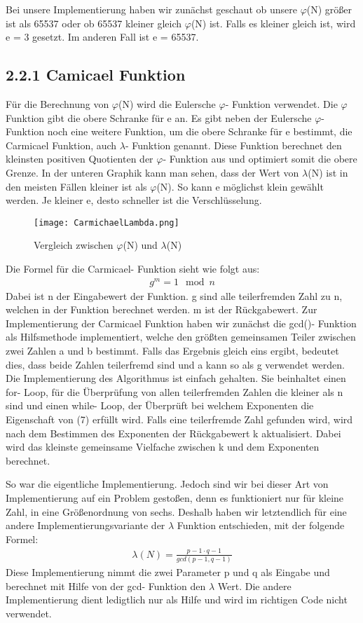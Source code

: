 \documentclass[course=asp]{aspdoc}
\begin{document}
Bei unsere Implementierung haben wir zunächst geschaut ob unsere $\varphi $(N) größer ist als 65537 oder ob 65537 kleiner gleich $\varphi $(N) ist. Falls es kleiner gleich ist, wird e = 3 gesetzt. Im anderen Fall ist e = 65537.
\subsection*{2.2.1 Camicael Funktion} 
Für die Berechnung von $\varphi $(N) wird die Eulersche $\varphi $- Funktion verwendet. Die $\varphi $ Funktion gibt die obere Schranke für e an. Es gibt neben der Eulersche $\varphi $- Funktion noch eine weitere Funktion, um die obere Schranke für e bestimmt, die Carmicael Funktion, auch $\lambda $- Funktion genannt. Diese Funktion berechnet den kleinsten positiven Quotienten der $\varphi $- Funktion aus und optimiert somit die obere Grenze. In der unteren Graphik kann man sehen, dass der Wert von $\lambda $(N) ist in den meisten Fällen kleiner ist als  $\varphi $(N). So kann e möglichst klein gewählt werden. Je kleiner e, desto schneller ist die Verschlüsselung. 
\begin{figure}[h]
\centering
\texttt{[image: CarmichaelLambda.png]}
\caption{Vergleich zwischen $\varphi $(N) und $\lambda $(N)}
\end{figure}

Die Formel für die Carmicael- Funktion sieht wie folgt aus:
\begin{align}
	g^m = 1 \mod n
\end{align} 
Dabei ist n der Eingabewert der Funktion. g sind alle teilerfremden Zahl zu n, welchen in der Funktion berechnet werden. m ist der Rückgabewert. Zur Implementierung der Carmicael Funktion haben wir zunächst die gcd()- Funktion als Hilfsmethode implementiert, welche den größten gemeinsamen Teiler zwischen zwei Zahlen a und b bestimmt. Falls das Ergebnis gleich eins ergibt, bedeutet dies, dass beide Zahlen teilerfremd sind und a kann so als g verwendet werden. Die Implementierung des Algorithmus ist einfach gehalten. Sie beinhaltet einen for- Loop, für die Überprüfung von allen teilerfremden Zahlen die kleiner als n sind und einen while- Loop, der Überprüft bei welchem Exponenten die Eigenschaft von (7) erfüllt wird. Falls eine teilerfremde Zahl gefunden wird, wird nach dem Bestimmen des Exponenten der Rückgabewert k aktualisiert. Dabei wird das kleinste gemeinsame Vielfache zwischen k und dem Exponenten berechnet. 

So war die eigentliche Implementierung. Jedoch sind wir bei dieser Art von Implementierung auf ein Problem gestoßen, denn es funktioniert nur für kleine Zahl, in eine Größenordnung von sechs. Deshalb haben wir letztendlich für eine andere Implementierungsvariante der $\lambda $ Funktion entschieden, mit der folgende Formel:
\begin{align}
	\lambda(N) = \frac{{p-1}\cdot{q-1}}{gcd(p-1, q-1)}
\end{align} 
Diese Implementierung nimmt die zwei Parameter p und q als Eingabe und berechnet mit Hilfe von der gcd- Funktion den $\lambda $ Wert. Die andere Implementierung dient ledigtlich nur als Hilfe und wird im richtigen Code nicht verwendet.
\end{document}
